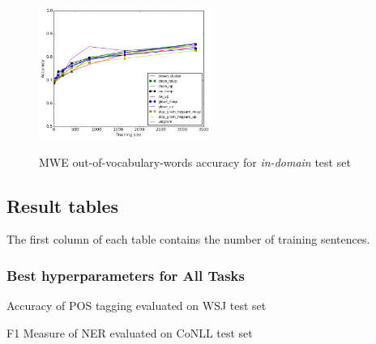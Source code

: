 \begin{figure}[h]
\caption{MWE out-of-vocabulary-words accuracy for \textit{in-domain} test set}
\centering
    	\includegraphics[width=0.5\textwidth]{plots/MWE-OOV.png}    
\label{fig:outmwe}
\end{figure}








\subsection{Result tables}

The first column of each table contains the number of training sentences.

\subsubsection{Best hyperparameters for All Tasks}

\begin{table}[h]
\centering
\begin{adjustbox}{max width=\textwidth}
\end{adjustbox}
\caption{Accuracy of POS tagging evaluated on WSJ test set}
\label{table:accuracy_pos}
\end{table}

\begin{table}[h]
\centering
\begin{adjustbox}{max width=\textwidth}
\end{adjustbox}
\caption{F1 Measure of NER evaluated on CoNLL test set}
\label{table:f1_ner}
\end{table}

